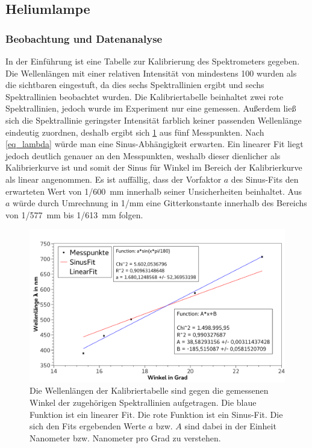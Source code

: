 \documentclass[
	a4paper,
	12pt,
	pagesize,
	ngerman
]{scrartcl}
\begin{document}
	
	\subsection{Heliumlampe} \label{ss_helium}
	\subsubsection{Beobachtung und Datenanalyse}
	In der Einführung ist eine Tabelle zur Kalibrierung des Spektrometers gegeben. %
	Die Wellenlängen mit einer relativen Intensität von mindestens 100 wurden als die sichtbaren eingestuft, da dies sechs Spektrallinien ergibt und sechs Spektrallinien beobachtet wurden.
	Die Kalibriertabelle beinhaltet zwei rote Spektrallinien, jedoch wurde im Experiment nur eine gemessen.
	Außerdem ließ sich die Spektrallinie geringster Intensität farblich keiner passenden Wellenlänge eindeutig zuordnen, deshalb ergibt sich \cref{fig_helium} aus fünf Messpunkten.
	Nach \cref{eq_lambda} würde man eine Sinus-Abhängigkeit erwarten. 
	Ein linearer Fit liegt jedoch deutlich genauer an den Messpunkten, weshalb dieser dienlicher als Kalibrierkurve ist und somit der Sinus für Winkel im Bereich der Kalibrierkurve als linear angenommen.
	Es ist auffällig, dass der Vorfaktor $a$ des Sinus-Fits den erwarteten Wert von 1/\SI{600}{mm} innerhalb seiner Unsicherheiten beinhaltet. 
	Aus $a$ würde durch Umrechnung in 1/\si{mm} eine Gitterkonstante innerhalb des Bereichs von 1/\SI{577}{mm} bis 1/\SI{613}{mm} folgen. %
	

	\begin{figure}[H] 
		\includegraphics[width=1\textwidth]{fig_helium} 
		\centering
		\caption{Die Wellenlängen der Kalibriertabelle sind gegen die gemessenen Winkel der zugehörigen Spektrallinien aufgetragen.
		Die blaue Funktion ist ein linearer Fit.
		Die rote Funktion ist ein Sinus-Fit.
		Die sich den Fits ergebenden Werte $a$ bzw. $A$ sind dabei in der Einheit Nanometer bzw. Nanometer pro Grad zu verstehen.}
		\label{fig_helium}
		\centering
	\end{figure}
\end{document}
